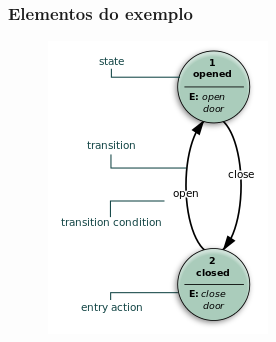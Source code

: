\documentclass[10pt]{beamer}
\begin{document}
\begin{frame}[fragile]

\frametitle{Elementos do exemplo}

\begin{figure}[!ht]
\centering
\includegraphics[height =.65\textheight,width=.6\textwidth]
{figuras/porta_aberta_fechada.png}
\end{figure}

\end{frame}
\end{document}
